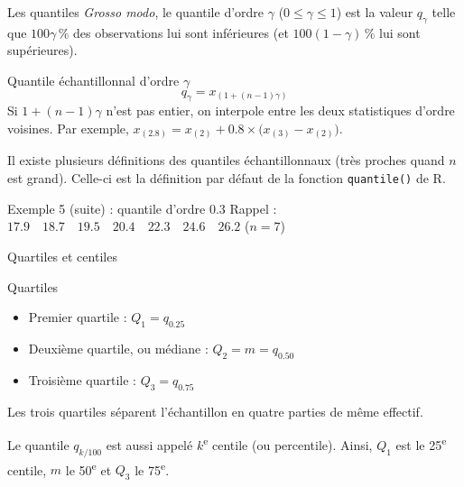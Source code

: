 \documentclass{BeamerTemplate}
\begin{document}
\begin{frame}[t]{Les quantiles}
  \emph{Grosso modo}, le \alert{quantile d'ordre $\gamma$} ($0 \le \gamma \le 1$)
  est la valeur $q_\gamma$ telle que $100\gamma\,\%$ des observations lui sont
  inférieures (et $100(1-\gamma)\,\%$ lui sont supérieures).

  \begin{Boite}{Quantile échantillonnal d'ordre $\gamma$}
    \[ q_\gamma = x_{(1 + (n-1)\gamma)} \]
    Si $1 + (n-1)\gamma$ n'est pas entier, on \alert{interpole} entre les deux
    statistiques d'ordre voisines. Par exemple,
    $x_{(2.8)} = x_{(2)} + 0.8 \times \big(x_{(3)} - x_{(2)}\big)$.
  \end{Boite}

  {\small Il existe plusieurs définitions des quantiles échantillonnaux (très
  proches quand $n$ est grand). Celle-ci est la définition par défaut de la
  fonction \texttt{quantile()} de R.}
\end{frame}

\begin{frame}[t]{Exemple 5 (suite) : quantile d'ordre 0.3}
  Rappel : $17.9 \quad 18.7 \quad 19.5 \quad 20.4 \quad 22.3 \quad 24.6
  \quad 26.2$ \quad ($n = 7$)

  \medskip

\end{frame}

\begin{frame}[t]{Quartiles et centiles}
  \begin{Boite}{Quartiles}
    \begin{itemize}
      \item Premier quartile : $Q_1 = q_{0.25}$
      \item Deuxième quartile, ou \alert{médiane} : $Q_2 = m = q_{0.50}$
      \item Troisième quartile : $Q_3 = q_{0.75}$
    \end{itemize}
  \end{Boite}
  Les trois quartiles séparent l'échantillon en quatre parties de même
  effectif.

  \medskip
  Le quantile $q_{k/100}$ est aussi appelé $k$\textsuperscript{e}
  \alert{centile} (ou percentile). Ainsi, $Q_1$ est le 25\textsuperscript{e}
  centile, $m$ le 50\textsuperscript{e} et $Q_3$ le 75\textsuperscript{e}.
\end{frame}
\end{document}
